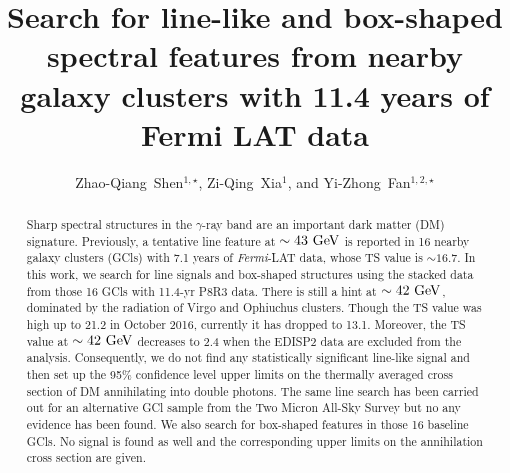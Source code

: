 \documentclass[
	twocolumn,
]{aastex6} %
\begin{document}
\title{Search for line-like and box-shaped spectral features from nearby galaxy clusters with 11.4 years of Fermi LAT data}

\author{Zhao-Qiang~Shen$^{1,\star}$, Zi-Qing~Xia$^{1}$, and Yi-Zhong~Fan$^{1,2,\star}$}

\begin{abstract}
	Sharp spectral structures in the $\gamma$-ray band are an important dark matter (DM) signature.
	Previously, a tentative line feature at $\sim 43~{\rm GeV}$ is reported in 16 nearby galaxy clusters (GCls) with 7.1 years of \emph{Fermi}-LAT data, whose TS value is $\sim 16.7$.
	In this work, we search for line signals and box-shaped structures using the stacked data from those 16 GCls with 11.4-yr P8R3 data.
	There is still a hint at $\sim {42~\rm GeV}$, dominated by the radiation of Virgo and Ophiuchus clusters.
	Though the TS value was high up to 21.2 in October 2016, currently it has dropped to 13.1.
	Moreover, the TS value at $\sim {42~\rm GeV}$ decreases to 2.4 when the EDISP2 data are excluded from the analysis.
	Consequently, we do not find any statistically significant line-like signal and then set up the 95\% confidence level upper limits on the thermally averaged cross section of DM annihilating into double photons.
	The same line search has been carried out for an alternative GCl sample from the Two Micron All-Sky Survey but no any evidence has been found.
	We also search for box-shaped features in those 16 baseline GCls.
	No signal is found as well and the corresponding upper limits on the annihilation cross section are given.
\end{abstract}

\maketitle

\end{document}
